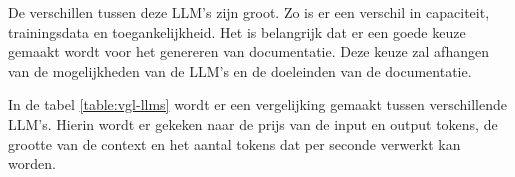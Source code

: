 De verschillen tussen deze LLM's zijn groot. Zo is er een verschil in capaciteit, trainingsdata en toegankelijkheid.
Het is belangrijk dat er een goede keuze gemaakt wordt voor het genereren van documentatie.
Deze keuze zal afhangen van de mogelijkheden van de LLM's en de doeleinden van de documentatie.

\begin{table}[h!]
\centering
{}
\caption{Vergelijking van verschillende LLM's op basis van prijs (\$), context (aantal tokens) en snelheid (Tokens per seconde) \autocite{ArtificialAnalysis2024}}
\label{table:vgl-llms}
\end{table}

In de tabel \ref{table:vgl-llms} wordt er een vergelijking gemaakt tussen verschillende LLM's.
Hierin wordt er gekeken naar de prijs van de input en output tokens, de grootte van de context en het aantal tokens dat per seconde verwerkt kan worden.

